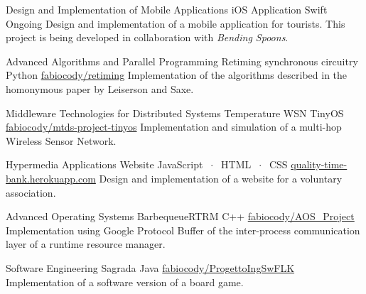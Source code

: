 

\begin{cventries}

\cventry
    {Design and Implementation of Mobile Applications}
    {iOS Application}
    {Swift}
    {Ongoing}
    {Design and implementation of a mobile application for tourists. This project is being developed in collaboration with \textit{Bending Spoons}.}
    
\cventry
    {Advanced Algorithms and Parallel Programming}
    {Retiming synchronous circuitry}
    {Python}
    {\href{https://github.com/fabiocody/retiming}{\faGithub\acvHeaderIconSep fabiocody/retiming}}
    {Implementation of the algorithms described in the homonymous paper by Leiserson and Saxe.}
    
\cventry
    {Middleware Technologies for Distributed Systems}
    {Temperature WSN}
    {TinyOS}
    {\href{https://github.com/fabiocody/mtds-project-tinyos}{\faGithub\acvHeaderIconSep fabiocody/mtds-project-tinyos}}
    {Implementation and simulation of a multi-hop Wireless Sensor Network.}
    
\cventry
    {Hypermedia Applications}
    {Website}
    {JavaScript $\;\cdot\;$ HTML $\;\cdot\;$ CSS}
    {\href{https://quality-time-bank.herokuapp.com}{\faGlobe\acvHeaderIconSep quality-time-bank.herokuapp.com}}
    {Design and implementation of a website for a voluntary association.}
    
\cventry
    {Advanced Operating Systems}
    {BarbequeueRTRM}
    {C++}
    {\href{https://github.com/fabiocody/AOS\_Project/tree/protobuf}{\faGithub\acvHeaderIconSep fabiocody/AOS\_Project}}
    {Implementation using Google Protocol Buffer of the inter-process communication layer of a runtime resource manager.}

\begin{comment}
\cventry
    {Internet of Things}
    {Smart bins}
    {Contiki}
    {\href{https://github.com/fabiocody/CodiglioniNicheliniIoT}{\faGithub\acvHeaderIconSep fabiocody/CodiglioniNicheliniIoT}}
    {Implementation and simulation of a smart bins system.}
\fi
\end{comment}
    
\cventry
    {Software Engineering}
    {Sagrada}
    {Java}
    {\href{https://github.com/fabiocody/ProgettoIngSwFLK}{\faGithub\acvHeaderIconSep fabiocody/ProgettoIngSwFLK}}
    {Implementation of a software version of a board game.}
\end{cventries}
